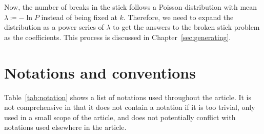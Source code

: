 \documentclass[oneside,12pt,final]{ucthesis-CA2012}
\newcommand{\lmd}{\lambda}
\newcommand{\ceq}{\coloneqq}
\begin{document}
\begin{mainmatter}
Now, the number of breaks in the stick follows a Poisson distribution with mean $\lmd\ceq-\ln P$
instead of being fixed at $k$.
Therefore, we need to expand the distribution as a power series of $\lmd$
to get the answers to the broken stick problem as the coefficients.
This process is discussed in Chapter~\ref{sec:generating}.

\chapter{Notations and conventions}

Table~\ref{tab:notation} shows a list of notations used throughout the article.
It is not comprehensive in that it does not contain a notation
if it is too trivial, only used in a small scope of the article,
and does not potentially conflict with notations used elsewhere in the article.


\end{mainmatter}
\end{document}
